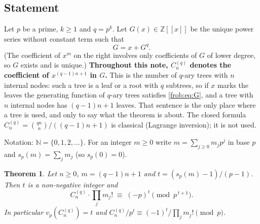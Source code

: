 \documentclass[11pt]{article}
\newtheorem{theorem}{Theorem}[section]
\theoremstyle{definition}
\theoremstyle{remark}
\numberwithin{equation}{section}
\numberwithin{figure}{section}
\newcommand{\Z}{\mathbb Z}
\newcommand{\N}{\mathbb N}
\newcommand{\C}{C_n^{(q)}}
\newcommand{\refnote}[1]{[\emph{Note added on 15 November after an AI referee's report:} #1]}
\newcommand{\revnote}[1]{[\emph{Added on 15 November after an AI review of the report:} #1]}
\begin{document}
\subsection{Statement}\label{frob:sec:statement}

Let $p$ be a prime, $k\ge1$ and $q=p^k$. Let $G(x)\in\Z[[x]]$ be the unique power series
without constant term such that
\begin{equation}\label{frob:eq:G}
 G=x+G^{q}.
\end{equation}
(The coefficient of $x^m$ on the right involves only coefficients of $G$ of lower degree, so
$G$ exists and is unique.) \textbf{Throughout this note, $\C$ denotes the coefficient of
$x^{(q-1)n+1}$ in $G$.} This is the number of $q$-ary trees with $n$ internal nodes: such a
tree is a leaf or a root with $q$ subtrees, so if $x$ marks the leaves the generating
function of $q$-ary trees satisfies \eqref{frob:eq:G}, and a tree with $n$ internal nodes has
$(q-1)n+1$ leaves. That sentence is the only place where a tree is used, and only to say what
the theorem is about. The closed formula $\C=\binom{qn}{n}/((q-1)n+1)$ is classical (Lagrange
inversion); it is not used.

Notation: $\N=\{0,1,2,\dots\}$. For an integer $m\ge0$ write $m=\sum_{j\ge0}m_jp^j$ in base
$p$ and $s_p(m)=\sum_jm_j$ (so $s_p(0)=0$).

\begin{theorem}\label{frob:thm}
Let $n\ge0$, $m=(q-1)n+1$ and $t=(s_p(m)-1)/(p-1)$. Then $t$ is a non-negative integer and
\[
 \C\cdot\prod_{j}m_j!\;\equiv\;(-p)^{t}\pmod{p^{\,t+1}} .
\]
In particular $v_p(\C)=t$ and $\C/p^{t}\equiv(-1)^t/\prod_jm_j!\pmod p$.
\end{theorem}
\end{document}
